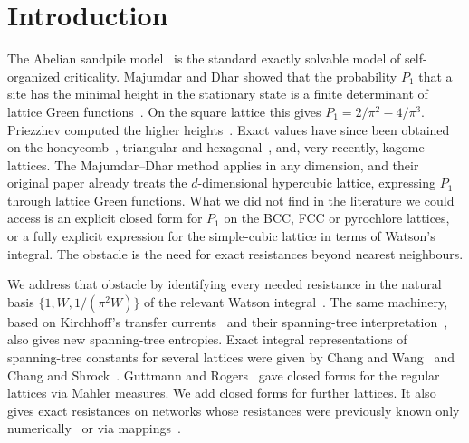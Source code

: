 \documentclass[aps,pre,10pt,twocolumn,superscriptaddress,nofootinbib]{revtex4-2}
\begin{document}
\maketitle

\section{Introduction}
\label{sec:intro}

The Abelian sandpile model~\cite{BTW1987,Dhar1990} is the standard exactly solvable model of
self-organized criticality. Majumdar and Dhar showed that the probability $P_1$ that a site
has the minimal height in the stationary state is a finite determinant of lattice Green
functions~\cite{MajumdarDhar1991}. On the square lattice this gives
$P_1=2/\pi^2-4/\pi^3$. Priezzhev computed the higher heights~\cite{Priezzhev1994}. Exact values
have since been obtained on the honeycomb~\cite{AzimiTafreshi2010}, triangular and
hexagonal~\cite{PonceletRuelle2017}, and, very recently, kagome~\cite{Liu2026} lattices. The
Majumdar--Dhar method applies in any dimension, and their original paper already treats the
$d$-dimensional hypercubic lattice, expressing $P_1$ through lattice Green functions. What we did
not find in the literature we could access is an explicit closed form for $P_1$ on the BCC, FCC or
pyrochlore lattices, or a fully explicit expression for the simple-cubic lattice in terms of Watson's
integral. The obstacle is the need for exact resistances beyond nearest neighbours.

We address that obstacle by identifying every needed resistance in the natural basis
$\{1,W,1/(\pi^2W)\}$ of the relevant Watson integral~\cite{Watson1939,GlasserZucker1977}. The
same machinery, based on Kirchhoff's transfer currents~\cite{Kirchhoff1847} and their spanning-tree
interpretation~\cite{BurtonPemantle1993,LyonsPeres2016}, also gives new spanning-tree entropies.
Exact integral representations of spanning-tree constants for several lattices were given by
Chang and Wang~\cite{ChangWang2006} and Chang and Shrock~\cite{ChangShrock2006}. Guttmann and
Rogers~\cite{GuttmannRogers2012} gave closed forms for the regular lattices via Mahler measures. We add
closed forms for further lattices. It also gives exact resistances on networks whose resistances were previously known
only numerically~\cite{Owaidat2013} or via mappings~\cite{Cserti2011}.
\end{document}

